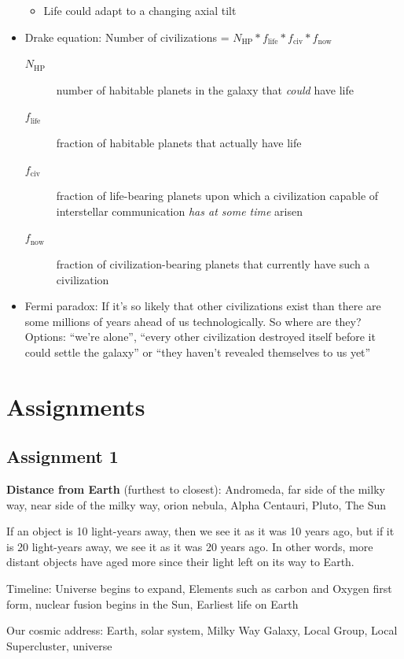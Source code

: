 \documentclass[12pt]{article}
\begin{document}
\begin{itemize}
\begin{itemize}
\item Life could adapt to a changing axial tilt
\end{itemize}
\item Drake equation: Number of civilizations = $N_\text{HP} * f_\text{life} * f_\text{civ} * f_\text{now}$
\begin{description}
\item[$N_\text{HP}$] number of habitable planets in the galaxy that \emph{could} have life
\item[$f_\text{life}$] fraction of habitable planets that actually have life
\item[$f_\text{civ}$] fraction of life-bearing planets upon which a civilization capable of interstellar communication \emph{has at some time} arisen
\item[$f_\text{now}$] fraction of civilization-bearing planets that currently have such a civilization
\end{description}
\item Fermi paradox: If it's so likely that other civilizations exist than there are some millions of years ahead of us technologically.  So where are they?  Options: ``we're alone'', ``every other civilization destroyed itself before it could settle the galaxy'' or ``they haven't revealed themselves to us yet''
\end{itemize}


\section{Assignments}
\subsection{Assignment 1}
{\bf Distance from Earth} (furthest to closest): Andromeda, far side of the milky way, near side of the milky way, orion nebula, Alpha Centauri, Pluto, The Sun

If an object is 10 light-years away, then we see it as it was 10 years ago, but if it is 20 light-years away, we see it as it was 20 years ago. In other words, more distant objects have aged more since their light left on its way to Earth.

Timeline: Universe begins to expand, Elements such as carbon and Oxygen first form, nuclear fusion begins in the Sun, Earliest life on Earth

Our cosmic address: Earth, solar system, Milky Way Galaxy, Local Group, Local Supercluster, universe
\end{document}
